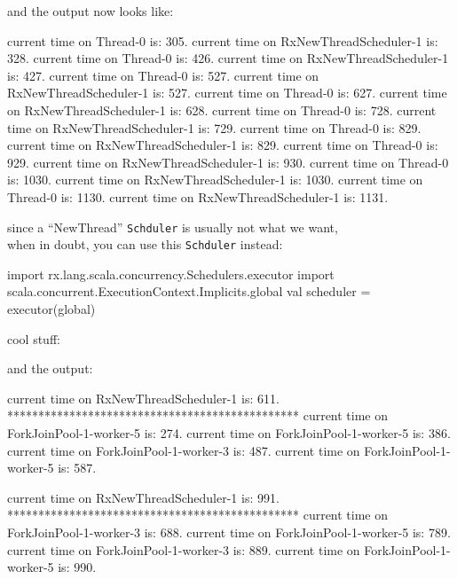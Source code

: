 \documentclass[8pt]{beamer}
\newcommand{\codeclass}[1]{\texttt{\textcolor[rgb]{0.4,0.85,0.9375}{#1}}}
\begin{document}
  \newpage
  and the output now looks like:
  \begin{textcode}
current time on Thread-0 is: 305.
current time on RxNewThreadScheduler-1 is: 328.
current time on Thread-0 is: 426.
current time on RxNewThreadScheduler-1 is: 427.
current time on Thread-0 is: 527.
current time on RxNewThreadScheduler-1 is: 527.
current time on Thread-0 is: 627.
current time on RxNewThreadScheduler-1 is: 628.
current time on Thread-0 is: 728.
current time on RxNewThreadScheduler-1 is: 729.
current time on Thread-0 is: 829.
current time on RxNewThreadScheduler-1 is: 829.
current time on Thread-0 is: 929.
current time on RxNewThreadScheduler-1 is: 930.
current time on Thread-0 is: 1030.
current time on RxNewThreadScheduler-1 is: 1030.
current time on Thread-0 is: 1130.
current time on RxNewThreadScheduler-1 is: 1131.   
  \end{textcode}

  since a ``NewThread'' \codeclass{Schduler} is usually not what we want, \\
  when in doubt, you can use this \codeclass{Schduler} instead:
  \begin{scalacode}
import rx.lang.scala.concurrency.Schedulers.executor
import scala.concurrent.ExecutionContext.Implicits.global
val scheduler = executor(global)
  \end{scalacode}
  \newpage
  
  cool stuff:
  \newpage
  
  and the output:
  \begin{textcode}
current time on RxNewThreadScheduler-1 is: 611.
***********************************************
current time on ForkJoinPool-1-worker-5 is: 274.
current time on ForkJoinPool-1-worker-5 is: 386.
current time on ForkJoinPool-1-worker-3 is: 487.
current time on ForkJoinPool-1-worker-5 is: 587.

current time on RxNewThreadScheduler-1 is: 991.
***********************************************
current time on ForkJoinPool-1-worker-3 is: 688.
current time on ForkJoinPool-1-worker-5 is: 789.
current time on ForkJoinPool-1-worker-3 is: 889.
current time on ForkJoinPool-1-worker-5 is: 990.
  \end{textcode}
  \medskip
  
\end{document}
